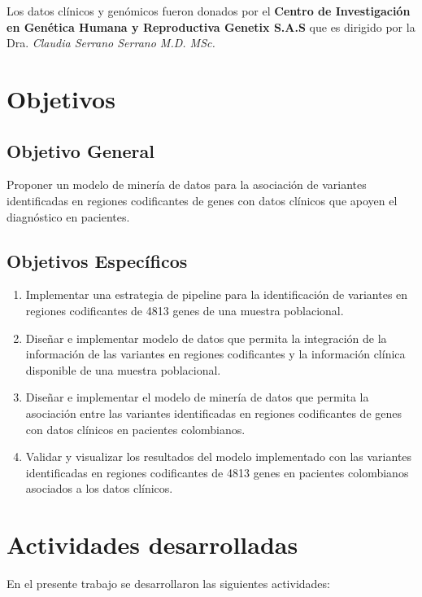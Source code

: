 Los datos clínicos y genómicos fueron donados por el \textbf{Centro de Investigación en Genética Humana y Reproductiva Genetix S.A.S} que es dirigido por la Dra. \textit{Claudia Serrano Serrano M.D. MSc.} 

\section*{Objetivos}

\subsection*{Objetivo General}%
 
Proponer un modelo de minería de datos para la asociación de variantes  identificadas en regiones codificantes de genes con datos clínicos que apoyen el
diagnóstico en pacientes.

\subsection*{Objetivos Espec\'ificos}

\begin{enumerate}
	\item Implementar una estrategia de pipeline para la identificación de variantes en regiones codificantes de 4813 genes de una muestra poblacional.
	\item Diseñar e implementar modelo de datos que permita la integración de la información de las variantes en regiones codificantes y la información  clínica disponible de una muestra poblacional.
	\item Diseñar e implementar el modelo de minería de datos que permita la	asociación entre las variantes identificadas en regiones codificantes de genes con datos clínicos en pacientes colombianos.
	\item Validar y visualizar los resultados del modelo implementado con las variantes identificadas en regiones codificantes de 4813 genes en	pacientes colombianos asociados a los datos clínicos.  
\end{enumerate}

\section*{Actividades desarrolladas}

En el presente trabajo se desarrollaron las siguientes actividades:


